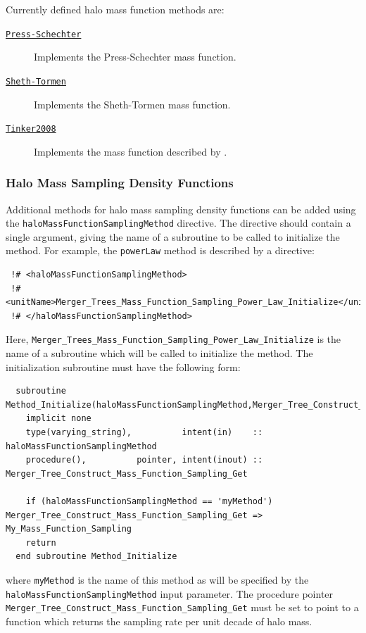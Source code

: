 Currently defined halo mass function methods are:
\begin{description}
 \item [\hyperlink{structure_formation.halo_mass_function.Press-Schechter.F90:halo_mass_function_press_schechter:halo_mass_function_differential_press_schechter}{{\tt Press-Schechter}}] Implements the Press-Schechter \citep{press_formation_1974} mass function.
 \item [\hyperlink{structure_formation.halo_mass_function.Sheth-Tormen.F90:halo_mass_function_sheth_tormen:halo_mass_function_sheth_tormen_differential}{{\tt Sheth-Tormen}}] Implements the Sheth-Tormen \citep{sheth_ellipsoidal_2001} mass function.
 \item [\hyperlink{structure_formation.halo_mass_function.Tinker2008.F90:halo_mass_function_tinker2008:halo_mass_function_differential_tinker2008}{{\tt Tinker2008}}] Implements the mass function described by \cite{tinker_towardhalo_2008}.
\end{description}

\subsubsection{Halo Mass Sampling Density Functions}

Additional methods for halo mass sampling density functions can be added using the {\tt haloMassFunctionSamplingMethod} directive. The directive should contain a single argument, giving the name of a subroutine to be called to initialize the method. For example, the {\tt powerLaw} method is described by a directive:
\begin{verbatim}
 !# <haloMassFunctionSamplingMethod>
 !#  <unitName>Merger_Trees_Mass_Function_Sampling_Power_Law_Initialize</unitName>
 !# </haloMassFunctionSamplingMethod>
\end{verbatim}
Here, {\tt Merger\_Trees\_Mass\_Function\_Sampling\_Power\_Law\_Initialize} is the name of a subroutine which will be called to initialize the method. The initialization subroutine must have the following form:
\begin{verbatim}
  subroutine Method_Initialize(haloMassFunctionSamplingMethod,Merger_Tree_Construct_Mass_Function_Sampling_Get)
    implicit none
    type(varying_string),          intent(in)    :: haloMassFunctionSamplingMethod
    procedure(),          pointer, intent(inout) :: Merger_Tree_Construct_Mass_Function_Sampling_Get
    
    if (haloMassFunctionSamplingMethod == 'myMethod') Merger_Tree_Construct_Mass_Function_Sampling_Get => My_Mass_Function_Sampling
    return
  end subroutine Method_Initialize
\end{verbatim}
where {\tt myMethod} is the name of this method as will be specified by the {\tt haloMassFunctionSamplingMethod} input parameter. The procedure pointer {\tt Merger\_Tree\_Construct\_Mass\_Function\_Sampling\_Get} must be set to point to a function which returns the sampling rate per unit decade of halo mass.

